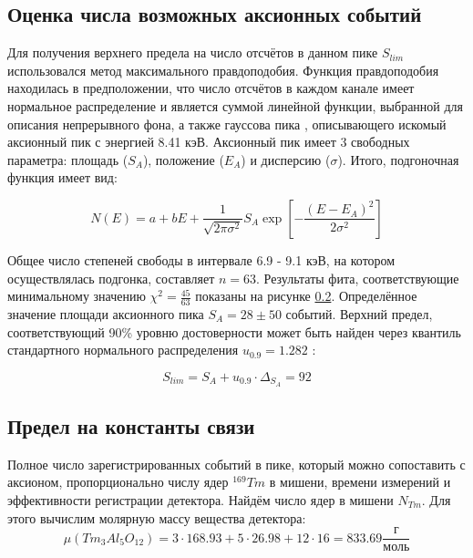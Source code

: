 \documentclass[a4paper,article,14pt]{extarticle}
\begin{document}
\subsection{Оценка числа возможных аксионных событий}

%

Для получения верхнего предела на число отсчётов в данном пике $S_{lim}$ использовался метод максимального правдоподобия. Функция правдоподобия находилась в предположении, что число отсчётов в каждом канале имеет нормальное распределение и является суммой линейной функции, выбранной для описания непрерывного фона, а также гауссова пика , описывающего искомый аксионный пик с энергией 8.41 кэВ. Аксионный пик имеет 3 свободных параметра: площадь ($S_A$), положение ($E_A$) и дисперсию ($\sigma$). Итого, подгоночная функция имеет вид:

\begin{equation}
    N\left( E \right) = a + bE + \frac{1}{{\sqrt {2\pi {\sigma ^2}} }} S_A\exp \left[ { - \frac{{{{\left( {E - {E_A}} \right)}^2}}}{{2{\sigma ^2}}}} \right]
\end{equation}

Общее число степеней свободы в интервале 6.9 - 9.1 кэВ, на котором осуществлялась подгонка, составляет $n = 63$. Результаты фита, соответствующие минимальному значению $\chi^2 = \frac{45}{63}$ показаны на рисунке \ref{}. Определённое значение площади аксионного пика $S_A = 28 \pm 50$ событий. Верхний предел, соответствующий 90\% уровню достоверности может быть найден через квантиль стандартного нормального распределения $u_{0.9} = 1.282 $ :

\begin{equation}
    S_{lim} = S_A + u_{0.9} \cdot \Delta_{S_A} = 92
\end{equation}

\subsection{Предел на константы связи}
Полное число зарегистрированных событий в пике, который можно сопоставить с аксионом, пропорционально числу ядер $^{169}Tm$ в мишени, времени измерений и эффективности регистрации детектора. Найдём число ядер в мишени ${N_{Tm}}$. Для этого вычислим молярную массу вещества детектора:
\begin{equation}
    \mu \left( {T{m_3}A{l_5}{O_{12}}} \right) = 3 \cdot 168.93 + 5 \cdot 26.98 + 12 \cdot 16 = 833.69\frac{\text{г}}{{\text{моль}}}
\end{equation}
\end{document}

